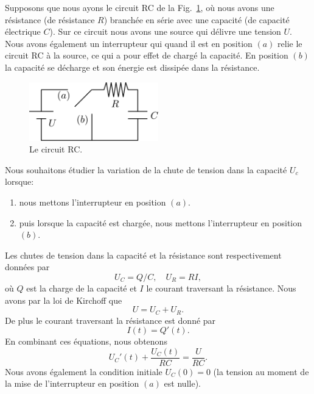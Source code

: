 \documentclass[a4paper,12pt]{book}
\begin{document}
Supposons que nous ayons le circuit RC de la Fig.~\ref{fig_rc}, où nous avons une résistance (de résistance $R$) branchée en série avec une capacité 
(de capacité électrique $C$). Sur ce circuit nous avons une source qui délivre une tension $U$. Nous avons également un interrupteur qui 
quand il est en position $(a)$ relie le circuit RC à la source, ce qui a pour effet de chargé la capacité. En position $(b)$ 
la capacité se décharge et son énergie est dissipée dans la résistance.
\begin{figure}[htp]
\begin{center}
\includegraphics[width=0.5\textwidth]{figs/rc.pdf}
\caption{Le circuit RC.}\label{fig_rc}
\end{center}
\end{figure}
Nous souhaitons étudier la variation de la chute de tension dans la capacité $U_c$ lorsque:
\begin{enumerate}
 \item nous mettons l'interrupteur en position $(a)$.
 \item puis lorsque la capacité est chargée, nous mettons l'interrupteur en position $(b)$.
\end{enumerate}
Les chutes de tension dans la capacité et la résistance sont respectivement données par
\begin{equation}
 U_C=Q/C,\quad U_R=R I,
\end{equation}
où $Q$ est la charge de la capacité et $I$ le courant traversant la résistance. Nous avons par la loi de Kirchoff
que
\begin{equation}
 U=U_C+U_R.\label{eq_tot_tension}
\end{equation}
De plus le courant traversant la résistance est donné par 
\begin{equation}
 I(t)=Q'(t).
\end{equation}
En combinant ces équations, nous obtenons 
\begin{equation}
 U_C'(t)+\frac{U_C(t)}{RC}=\frac{U}{RC}.
\end{equation}
Nous avons également la condition initiale $U_C(0)=0$ (la tension au moment de la mise de l'interrupteur en position $(a)$ est nulle).
\end{document}
